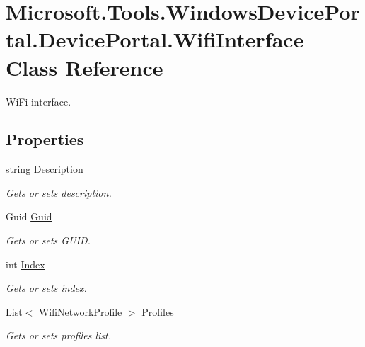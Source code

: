 \hypertarget{class_microsoft_1_1_tools_1_1_windows_device_portal_1_1_device_portal_1_1_wifi_interface}{}\section{Microsoft.\+Tools.\+Windows\+Device\+Portal.\+Device\+Portal.\+Wifi\+Interface Class Reference}
\label{class_microsoft_1_1_tools_1_1_windows_device_portal_1_1_device_portal_1_1_wifi_interface}


Wi\+Fi interface.  


\subsection*{Properties}
\begin{DoxyCompactItemize}
\item 
string \hyperlink{class_microsoft_1_1_tools_1_1_windows_device_portal_1_1_device_portal_1_1_wifi_interface_a706c0e5267fdb8328edcf08bc0602907}{Description}
\begin{DoxyCompactList}\small\item\em Gets or sets description. \end{DoxyCompactList}\item 
Guid \hyperlink{class_microsoft_1_1_tools_1_1_windows_device_portal_1_1_device_portal_1_1_wifi_interface_abacac72ac5c9706c8cbf07ca0f6e5598}{Guid}
\begin{DoxyCompactList}\small\item\em Gets or sets G\+U\+ID. \end{DoxyCompactList}\item 
int \hyperlink{class_microsoft_1_1_tools_1_1_windows_device_portal_1_1_device_portal_1_1_wifi_interface_a19d5b350fb08c75858a36c3f96421da5}{Index}
\begin{DoxyCompactList}\small\item\em Gets or sets index. \end{DoxyCompactList}\item 
List$<$ \hyperlink{class_microsoft_1_1_tools_1_1_windows_device_portal_1_1_device_portal_1_1_wifi_network_profile}{Wifi\+Network\+Profile} $>$ \hyperlink{class_microsoft_1_1_tools_1_1_windows_device_portal_1_1_device_portal_1_1_wifi_interface_a107df203b135714dfe64a924edbe4f54}{Profiles}
\begin{DoxyCompactList}\small\item\em Gets or sets profiles list. \end{DoxyCompactList}\end{DoxyCompactItemize}


